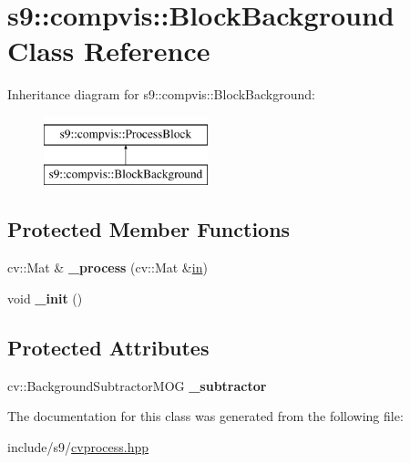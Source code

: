 \hypertarget{classs9_1_1compvis_1_1BlockBackground}{\section{s9\-:\-:compvis\-:\-:\-Block\-Background \-Class \-Reference}
\label{classs9_1_1compvis_1_1BlockBackground}
}
\-Inheritance diagram for s9\-:\-:compvis\-:\-:\-Block\-Background\-:\begin{figure}[H]
\begin{center}
\leavevmode
\includegraphics[height=2.000000cm]{classs9_1_1compvis_1_1BlockBackground}
\end{center}
\end{figure}
\subsection*{\-Protected \-Member \-Functions}
\begin{DoxyCompactItemize}
\item 
\hypertarget{classs9_1_1compvis_1_1BlockBackground_add7e518540385a836985c6946e59e5c6}{cv\-::\-Mat \& {\bfseries \-\_\-process} (cv\-::\-Mat \&\hyperlink{structin}{in})}\label{classs9_1_1compvis_1_1BlockBackground_add7e518540385a836985c6946e59e5c6}

\item 
\hypertarget{classs9_1_1compvis_1_1BlockBackground_ab6c5cfd547301eecabac428e42a5278c}{void {\bfseries \-\_\-init} ()}\label{classs9_1_1compvis_1_1BlockBackground_ab6c5cfd547301eecabac428e42a5278c}

\end{DoxyCompactItemize}
\subsection*{\-Protected \-Attributes}
\begin{DoxyCompactItemize}
\item 
\hypertarget{classs9_1_1compvis_1_1BlockBackground_a0e1dcdd35cb7453741b7144845ba14b9}{cv\-::\-Background\-Subtractor\-M\-O\-G {\bfseries \-\_\-subtractor}}\label{classs9_1_1compvis_1_1BlockBackground_a0e1dcdd35cb7453741b7144845ba14b9}

\end{DoxyCompactItemize}


\-The documentation for this class was generated from the following file\-:\begin{DoxyCompactItemize}
\item 
include/s9/\hyperlink{cvprocess_8hpp}{cvprocess.\-hpp}\end{DoxyCompactItemize}
